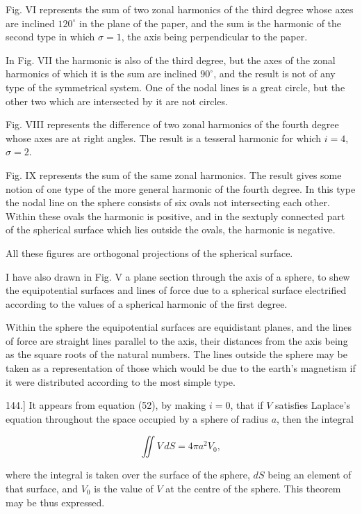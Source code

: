\documentclass[11pt,a4paper]{article}
\begin{document}
Fig. VI represents the sum of two zonal harmonics of the third degree whose axes are inclined $120^\circ$ in the plane of the paper, and the sum is the harmonic of the second type in which $\sigma=1$, the axis being perpendicular to the paper.

In Fig. VII the harmonic is also of the third degree, but the axes of the zonal harmonics of which it is the sum are inclined $90^\circ$, and the result is not of any type of the symmetrical system. One of the nodal lines is a great circle, but the other two which are intersected by it are not circles.

Fig. VIII represents the difference of two zonal harmonics of the fourth degree whose axes are at right angles. The result is a tesseral harmonic for which $i=4$, $\sigma=2$.

Fig. IX represents the sum of the same zonal harmonics. The result gives some notion of one type of the more general harmonic of the fourth degree. In this type the nodal line on the sphere consists of six ovals not intersecting each other. Within these ovals the harmonic is positive, and in the sextuply connected part of the spherical surface which lies outside the ovals, the harmonic is negative.

All these figures are orthogonal projections of the spherical surface.

I have also drawn in Fig. V a plane section through the axis of a sphere, to shew the equipotential surfaces and lines of force due to a spherical surface electrified according to the values of a spherical harmonic of the first degree.

Within the sphere the equipotential surfaces are equidistant planes, and the lines of force are straight lines parallel to the axis, their distances from the axis being as the square roots of the natural numbers. The lines outside the sphere may be taken as a representation of those which would be due to the earth's magnetism if it were distributed according to the most simple type.

144.] It appears from equation (52), by making $i=0$, that if $V$ satisfies Laplace's equation throughout the space occupied by a sphere of radius $a$, then the integral

\begin{equation}\tag{69}
\iint V\,dS=4\pi a^2V_0,
\end{equation}

where the integral is taken over the surface of the sphere, $dS$ being an element of that surface, and $V_0$ is the value of $V$ at the centre of the sphere. This theorem may be thus expressed.
\end{document}

